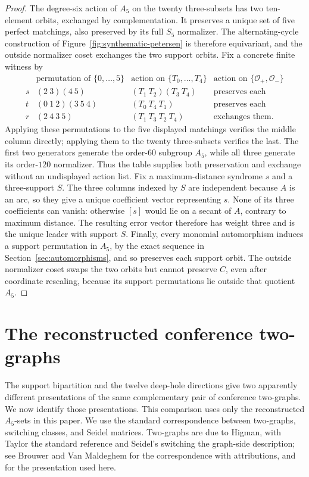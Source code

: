 \documentclass[11pt]{article}
\theoremstyle{definition}
\theoremstyle{remark}
\begin{document}
\begin{proof}
The degree-six action of $A_5$ on the twenty three-subsets has two
ten-element orbits, exchanged by complementation. It preserves a unique
set of five perfect matchings, also preserved by
its full $S_5$ normalizer. The alternating-cycle construction of
Figure~\ref{fig:synthematic-petersen} is therefore equivariant, and the
outside normalizer coset exchanges the two support orbits. Fix a
concrete finite witness by
\[
\begin{array}{c|c|c|c}
 &\text{permutation of }\{0,\ldots,5\}
 &\text{action on }\{T_0,\ldots,T_4\}
 &\text{action on }\{\mathcal O_+,\mathcal O_-\}\\
\hline
s&(2\ 3)(4\ 5)&(T_1\ T_2)(T_3\ T_4)&\text{preserves each}\\
t&(0\ 1\ 2)(3\ 5\ 4)&(T_0\ T_4\ T_1)&\text{preserves each}\\
r&(2\ 4\ 3\ 5)&(T_1\ T_3\ T_2\ T_4)&\text{exchanges them}.
\end{array}
\tag{\(*\)}\label{tab:normalizer-actions}
\]
Applying these permutations to the five displayed matchings verifies the
middle column directly; applying them to the twenty three-subsets verifies
the last. The first two generators
generate the order-$60$ subgroup $A_5$, while all three generate its
order-$120$ normalizer. Thus the table supplies both preservation and
exchange without an undisplayed action list. Fix a
maximum-distance syndrome $s$ and a three-support $S$. The three columns
indexed by $S$ are independent because $A$ is an arc, so they give a unique
coefficient vector representing $s$. None of its three coefficients can
vanish: otherwise $[s]$ would lie on a secant of $A$, contrary to maximum
distance. The resulting error vector therefore has weight three and is the
unique leader with support $S$. Finally, every monomial automorphism induces
a support permutation in $A_5$, by the exact sequence in
Section~\ref{sec:automorphisms}, and so preserves each support orbit. The
outside normalizer coset swaps the two orbits but cannot preserve $C$, even
after coordinate rescaling, because its support permutations lie outside
that quotient $A_5$.
\end{proof}

\section{The reconstructed conference two-graphs}
\label{sec:conference-two-graphs}

The support bipartition and the twelve deep-hole directions give two
apparently different presentations of the same complementary pair of
conference two-graphs.  We now identify those presentations.  This comparison
uses only the reconstructed $A_5$-sets in this paper.  We use the standard
correspondence between two-graphs, switching
classes, and Seidel matrices.  Two-graphs are due to Higman, with Taylor the
standard reference and Seidel's switching the graph-side description; see
Brouwer and Van Maldeghem \cite[\S1.1.12]{BrouwerVanMaldeghem} for the
correspondence with attributions, and \cite[\S2]{DuncanHoffmanSolazzo2011}
for the presentation used here.
\end{document}
